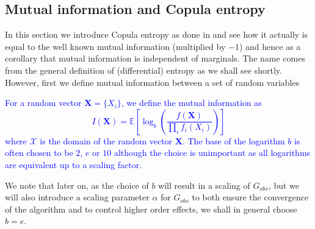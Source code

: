 \documentclass[../Thesis.tex]{subfiles}
\begin{document}
\subsection{Mutual information and Copula entropy}
In this section we introduce Copula entropy as done in \cite{Nonparametric-copula-entropy-and-network-deconvolution-method-for-causal-discovery-in-complex-manufacturing-systems} and see how it actually is equal to the well known mutual information (multiplied by $-1$) and hence as a corollary that mutual information is independent of marginals. The name comes from the general definition of (differential) entropy as we shall see shortly. However, first we define mutual information between a set of random variables
\textcolor{blue}{
    \begin{definition}\label{def:mutual information}
        For a random vector $\boldsymbol{X} = \{X_i\}$, we define the mutual information as
        $$I(\boldsymbol{X}) = \mathbb{E}\left[\log_b \left(\frac{f(\boldsymbol X)}{\prod_i f_i (X_i)}\right)\right]$$
        where $\mathcal{X}$ is the domain of the random vector $\boldsymbol{X}$.
        The base of the logarithm $b$ is often chosen to be $2$, $e$ or $10$ although the choice is unimportant as all logarithms are equivalent up to a scaling factor.
    \end{definition}
}
We note that later on, as the choice of $b$ will result in a scaling of $G_{obs}$, but we will also introduce a scaling parameter $\alpha$ for $G_{obs}$ to both ensure the convergence of the algorithm and to control higher order effects, we shall in general choose $b = e$.
\end{document}
